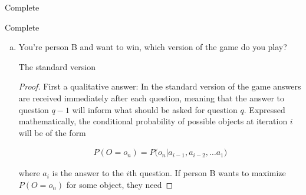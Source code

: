 \documentclass[11pt]{article}
\begin{document}
Complete

Complete

\noindent
\begin{enumerate}[(a)]\itemsep0pt
\item You're person B and want to win, which version of the game do you play?
	\begin{solution}
		The standard version
	\end{solution}

	\begin{proof}
		First a qualitative answer: In the standard version of the game
		answers are received immediately after each question, meaning that the
		answer to question $q-1$ will inform what should be asked for question
		$q$. Expressed mathematically, the conditional probability of possible
		objects at iteration $i$ will be of the form

		\begin{align}
			P(O=o_n) = P\bigg(o_n \Big\vert a_{i-1}, a_{i-2}, \dots a_{1}\bigg)
		\end{align}

		where $a_i$ is the answer to the $i$th question. If person B wants to
		maximize $P(O=o_n)$ for some object, they need
	\end{proof}
\end{enumerate}
\end{document}
